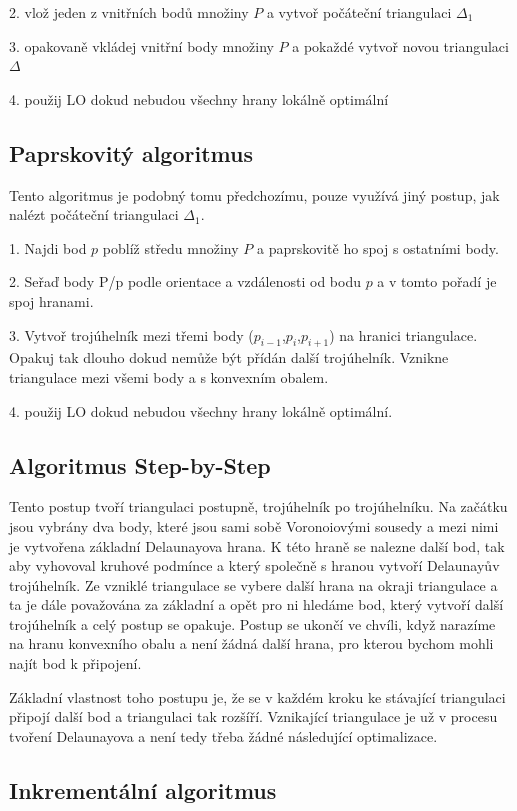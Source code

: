 \documentclass[12pt,a4paper]{article}
\begin{document}
2. vlož jeden z vnitřních bodů množiny $P$ a vytvoř počáteční triangulaci $\Delta_1$

3. opakovaně vkládej vnitřní body množiny $P$ a pokaždé vytvoř novou triangulaci $\Delta$

4. použij LO dokud nebudou všechny hrany lokálně optimální


\subsection{Paprskovitý algoritmus}

Tento algoritmus je podobný tomu předchozímu, pouze využívá jiný postup, jak nalézt počáteční triangulaci $\Delta_1$.

1. Najdi bod $p$ poblíž středu množiny $P$ a paprskovitě ho spoj s ostatními body.

2. Seřaď body {P/p} podle orientace a vzdálenosti od bodu $p$ a v tomto pořadí je spoj hranami. 

3. Vytvoř trojúhelník mezi třemi body ($p_{i-1}$,$p_i$,$p_{i+1}$) na hranici triangulace. Opakuj tak dlouho dokud nemůže být přídán další trojúhelník. Vznikne triangulace mezi všemi body a s konvexním obalem.

4. použij LO dokud nebudou všechny hrany lokálně optimální.

\subsection{Algoritmus Step-by-Step}

Tento postup tvoří triangulaci postupně, trojúhelník po trojúhelníku. Na začátku jsou vybrány dva body, které jsou sami sobě Voronoiovými sousedy a mezi nimi je vytvořena základní Delaunayova hrana. K této hraně se nalezne další bod, tak aby vyhovoval kruhové podmínce a který společně s hranou vytvoří Delaunayův trojúhelník. Ze vzniklé triangulace se vybere další hrana na okraji triangulace a ta je dále považována za základní a opět pro ni hledáme bod, který vytvoří další trojúhelník a celý postup se opakuje. Postup se ukončí ve chvíli, když narazíme na hranu konvexního obalu a není žádná další hrana, pro kterou bychom mohli najít bod k připojení.

Základní vlastnost toho postupu je, že se v každém kroku ke stávající triangulaci připojí další bod a triangulaci tak rozšíří. Vznikající triangulace je už v procesu tvoření Delaunayova a není tedy třeba žádné následující optimalizace.

\subsection{Inkrementální algoritmus}
\end{document}
